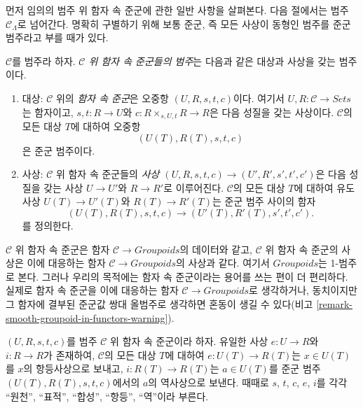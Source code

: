 \noindent
먼저 임의의 범주 위 함자 속 준군에 관한 일반 사항을 살펴본다.
다음 절에서는 범주 $\mathcal{C}_\Lambda$로 넘어간다.
명확히 구별하기 위해 보통 준군, 즉 모든 사상이 동형인 범주를
준군 범주라고 부를 때가 있다.

\begin{definition}
\label{definition-groupoid-in-functors}
$\mathcal{C}$를 범주라 하자. {\it $\mathcal{C}$ 위 함자 속 준군들의 범주}는
다음과 같은 대상과 사상을 갖는 범주이다.
\begin{enumerate}
\item 대상: $\mathcal{C}$ 위의 {\it 함자 속 준군}은 오중항
$(U, R, s, t, c)$이다. 여기서 $U, R : \mathcal{C} \to \textit{Sets}$는
함자이고, $s, t : R \to U$와 $c : R \times_{s, U, t} R \to R$은
다음 성질을 갖는 사상이다. $\mathcal{C}$의 모든 대상 $T$에 대하여 오중항
$$
(U(T), R(T), s, t, c)
$$
은 준군 범주이다.
\item 사상: $\mathcal{C}$ 위 함자 속 준군들의
{\it 사상 $(U, R, s, t, c) \to (U', R', s', t', c')$}은 다음 성질을
갖는 사상 $U \to U'$와 $R \to R'$로 이루어진다. $\mathcal{C}$의 모든
대상 $T$에 대하여 유도 사상 $U(T) \to U'(T)$와 $R(T) \to R'(T)$는
준군 범주 사이의 함자
$$
(U(T), R(T), s, t, c) \to (U'(T), R'(T), s', t', c').
$$
를 정의한다.
\end{enumerate}
\end{definition}

\begin{remark}
\label{remark-confusion-groupoids-in-functors}
$\mathcal{C}$ 위 함자 속 준군은 함자
$\mathcal{C} \to \textit{Groupoids}$의 데이터와 같고,
$\mathcal{C}$ 위 함자 속 준군의 사상은 이에 대응하는 함자
$\mathcal{C} \to \textit{Groupoids}$의 사상과 같다. 여기서
$\textit{Groupoids}$는 1-범주로 본다. 그러나 우리의 목적에는
함자 속 준군이라는 용어를 쓰는 편이 더 편리하다. 실제로 함자 속 준군을
이에 대응하는 함자 $\mathcal{C} \to \textit{Groupoids}$로 생각하거나,
동치이지만 그 함자에 결부된 준군값 쌍대 올범주로 생각하면 혼동이 생길 수
있다(비고 \ref{remark-smooth-groupoid-in-functors-warning}).
\end{remark}

\begin{remark}
\label{remark-identity-inverse}
$(U, R, s, t, c)$를 범주 $\mathcal{C}$ 위 함자 속 준군이라 하자.
유일한 사상 $e : U \to R$와 $i : R \to R$가 존재하여,
$\mathcal{C}$의 모든 대상 $T$에 대하여 $e: U(T) \to R(T)$는
$x \in U(T)$를 $x$의 항등사상으로 보내고, $i: R(T) \to R(T)$는
$a \in U(T)$를 준군 범주 $(U(T), R(T), s, t, c)$에서의 $a$의
역사상으로 보낸다. 때때로 $s$, $t$, $c$, $e$, $i$를 각각
``원천'', ``표적'', ``합성'', ``항등'', ``역''이라 부른다.
\end{remark}

